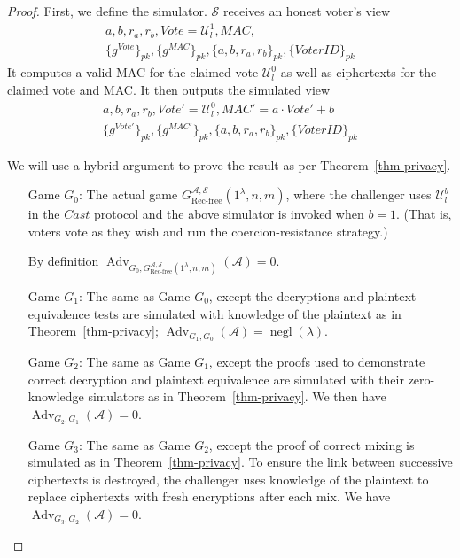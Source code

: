 \documentclass[12pt,a4paper]{article}
\DeclareMathOperator{\negl}{\text{negl}}
\DeclareMathOperator{\Adv}{\text{Adv}}
\theoremstyle{definition}
\newcommand{\Vote}{\mathit{Vote}}
\newcommand{\VoterID}{\mathit{VoterID}}
\newcommand{\Mac}{\mathit{MAC}}
\begin{document}
\begin{proof}
    First, we define the simulator. $\mathcal{S}$ receives an honest voter's view
    \begin{gather*}
        a, b, r_a, r_b, \Vote=\mathcal{U}^1_l, \Mac,\\\{g^\Vote\}_{pk}, \{g^\Mac\}_{pk}, \{a,b,r_a,r_b\}_{pk},\{\VoterID\}_{pk}
    \end{gather*}
    It computes a valid MAC for the claimed vote $\mathcal{U}^0_l$ as well as ciphertexts for the claimed vote and MAC. It then outputs the simulated view
    \begin{gather*}
        a, b, r_a, r_b, \Vote'=\mathcal{U}^0_l, \Mac'=a\cdot\Vote'+b\,\\\{g^{\Vote'}\}_{pk}, \{g^{\Mac'}\}_{pk}, \{a,b,r_a,r_b\}_{pk},\{\VoterID\}_{pk}
    \end{gather*}

    We will use a hybrid argument to prove the result as per Theorem~\ref{thm-privacy}.
    \begin{itemize}[leftmargin=4em]
        \item[Game] $G_0$: The actual game $G^{\mathcal{A},\mathcal{S}}_\text{Rec-free}(1^\lambda,n,m)$, where the challenger uses $\mathcal{U}^b_l$ in the $\mathit{Cast}$ protocol and the above simulator is invoked when $b=1$.  (That is, voters vote as they wish and run the coercion-resistance strategy.)
        
        By definition $\Adv_{G_0,G^{\mathcal{A},\mathcal{S}}_{\text{Rec-free}}(1^\lambda,n,m)}(\mathcal{A}) = 0$.
    
        \item[Game] $G_1$: The same as Game $G_0$, except the decryptions and plaintext equivalence tests are simulated with knowledge of the plaintext as in Theorem~\ref{thm-privacy}; $\Adv_{G_1, G_0}(\mathcal{A})=\negl(\lambda)$.
    
        \item[Game] $G_2$: The same as Game $G_1$, except the proofs used to demonstrate correct decryption and plaintext equivalence are simulated with their zero-knowledge simulators as in Theorem~\ref{thm-privacy}. We then have $\Adv_{G_2, G_1}(\mathcal{A})=0$.
 
        \item[Game] $G_3$: The same as Game $G_2$, except the proof of correct mixing is simulated as in Theorem~\ref{thm-privacy}. To ensure the link between successive ciphertexts is destroyed, the challenger uses knowledge of the plaintext to replace ciphertexts with fresh encryptions after each mix. We have $\Adv_{G_3, G_2}(\mathcal{A})=0$.
    

\end{itemize}
\end{proof}
\end{document}
